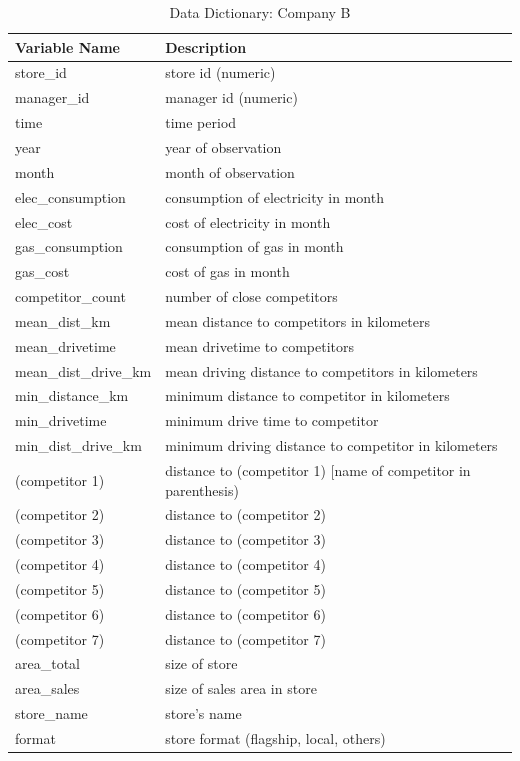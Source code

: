 \documentclass[
]{article}
\begin{document}
\begin{longtable}{ll} \caption{Data Dictionary: Company B} \label{tab:data_dictionaryB} \\ \toprule
Variable Name & Description \\ \hline 
store\_id & store id (numeric) \\
manager\_id & manager id (numeric) \\
time & time period \\
year & year of observation \\
month & month of observation \\
elec\_consumption & consumption of electricity in month \\
elec\_cost & cost of electricity in month \\
gas\_consumption & consumption of gas in month \\
gas\_cost & cost of gas in month \\
competitor\_count & number of close competitors \\
mean\_dist\_km & mean distance to competitors in kilometers \\
mean\_drivetime & mean drivetime to competitors \\
mean\_dist\_drive\_km & mean driving distance to competitors in kilometers \\
min\_distance\_km & minimum distance to competitor in kilometers \\
min\_drivetime & minimum drive time to competitor \\
min\_dist\_drive\_km & minimum driving distance to competitor in kilometers \\
(competitor 1) & distance to (competitor 1) [name of competitor in parenthesis) \\
(competitor 2) & distance to (competitor 2) \\
(competitor 3) & distance to (competitor 3) \\
(competitor 4) & distance to (competitor 4) \\
(competitor 5) & distance to (competitor 5) \\
(competitor 6) & distance to (competitor 6) \\
(competitor 7) & distance to (competitor 7) \\
area\_total & size of store \\
area\_sales & size of sales area in store \\
store\_name & store's name \\
format & store format (flagship, local, others) \\

\end{longtable}
\end{document}
